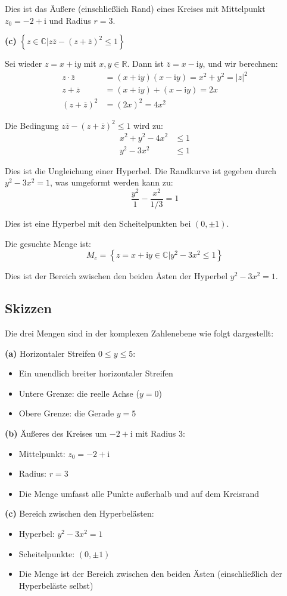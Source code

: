 \documentclass{article}
\newcommand{\C}{\mathbb{C}}
\newcommand{\im}{\mathrm{i}}
\newcommand{\Set}[1]{\left\{#1\right\}}
\newcommand{\conj}[1]{\overline{#1}}
\begin{document}
Dies ist das Äußere (einschließlich Rand) eines Kreises mit Mittelpunkt $z_0 = -2 + \im$ und Radius $r = 3$.

\textbf{(c)} $\Set{ z \in \C | z \conj{z} - (z + \conj{z} )^2 \leq 1 }$

Sei wieder $z = x + \im y$ mit $x, y \in \mathbb{R}$. Dann ist $\conj{z} = x - \im y$, und wir berechnen:
\begin{align}
z \cdot \conj{z} &= (x + \im y)(x - \im y) = x^2 + y^2 = |z|^2\\
z + \conj{z} &= (x + \im y) + (x - \im y) = 2x\\
(z + \conj{z})^2 &= (2x)^2 = 4x^2
\end{align}

Die Bedingung $z \conj{z} - (z + \conj{z} )^2 \leq 1$ wird zu:
\begin{align}
x^2 + y^2 - 4x^2 &\leq 1\\
y^2 - 3x^2 &\leq 1
\end{align}

Dies ist die Ungleichung einer Hyperbel. Die Randkurve ist gegeben durch $y^2 - 3x^2 = 1$, was umgeformt werden kann zu:
$$\frac{y^2}{1} - \frac{x^2}{1/3} = 1$$

Dies ist eine Hyperbel mit den Scheitelpunkten bei $(0, \pm 1)$. 

Die gesuchte Menge ist:
$$M_c = \Set{z = x + \im y \in \C | y^2 - 3x^2 \leq 1}$$

Dies ist der Bereich zwischen den beiden Ästen der Hyperbel $y^2 - 3x^2 = 1$.

\subsection*{Skizzen}

Die drei Mengen sind in der komplexen Zahlenebene wie folgt dargestellt:

\textbf{(a)} Horizontaler Streifen $0 \leq y \leq 5$:
\begin{itemize}
\item Ein unendlich breiter horizontaler Streifen
\item Untere Grenze: die reelle Achse ($y = 0$)
\item Obere Grenze: die Gerade $y = 5$
\end{itemize}

\textbf{(b)} Äußeres des Kreises um $-2 + \im$ mit Radius 3:
\begin{itemize}
\item Mittelpunkt: $z_0 = -2 + \im$
\item Radius: $r = 3$
\item Die Menge umfasst alle Punkte außerhalb und auf dem Kreisrand
\end{itemize}

\textbf{(c)} Bereich zwischen den Hyperbelästen:
\begin{itemize}
\item Hyperbel: $y^2 - 3x^2 = 1$
\item Scheitelpunkte: $(0, \pm 1)$
\item Die Menge ist der Bereich zwischen den beiden Ästen (einschließlich der Hyperbeläste selbst)
\end{itemize}
\end{document}
